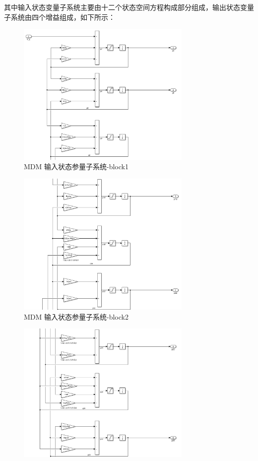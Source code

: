 \begin{itemize}
	其中输入状态变量子系统主要由十二个状态空间方程构成部分组成，输出状态变量子系统由四个增益组成，如下所示：
	\begin{figure}[!h]
		\centering
		\includegraphics[width=0.75\textwidth]{fig/simulink/MDM_simulink_block1.png}
		\caption{MDM 输入状态参量子系统-block1}
	\end{figure}
	\begin{figure}[!h]
		\centering
		\includegraphics[width=0.75\textwidth]{fig/simulink/MDM_simulink_block2.png}
		\caption{MDM 输入状态参量子系统-block2}
	\end{figure}
	\begin{figure}[!h]
		\centering
		\includegraphics[width=0.75\textwidth]{fig/simulink/MDM_simulink_block3.png}

\end{figure}
\end{itemize}
